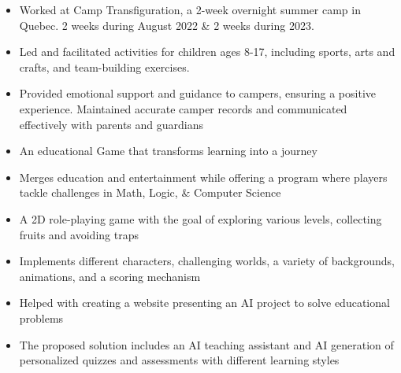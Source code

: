\documentclass[10pt,a4paper,ragged2e,withhyper]{altacv}
\begin{document}
\begin{paracol}{2}
\begin{itemize}
    \item Worked at Camp Transfiguration, a 2-week overnight summer camp in Quebec. 2 weeks during August 2022 \& 2 weeks during 2023. 
    \item Led and facilitated activities for children ages 8-17, including sports, arts and crafts, and team-building exercises. 
    \item Provided emotional support and guidance to campers, ensuring a positive experience. Maintained accurate camper records and communicated effectively with parents and guardians
\end{itemize}


\switchcolumn



\begin{itemize}
    \item An educational Game that transforms learning into a journey 
    \item Merges education and entertainment while offering a program where players tackle challenges in Math, Logic, \& Computer Science
\end{itemize}

\begin{itemize}
    \item A 2D role-playing game with the goal of exploring various levels, collecting fruits and avoiding traps
    \item Implements different characters, challenging worlds, a variety of backgrounds, animations, and a scoring mechanism 
\end{itemize}

\begin{itemize}
    \item Helped with creating a website presenting an AI project to solve educational problems
    \item The proposed solution includes an AI teaching assistant and AI generation of personalized quizzes and assessments with different learning styles
\end{itemize}


\end{paracol}
\end{document}
